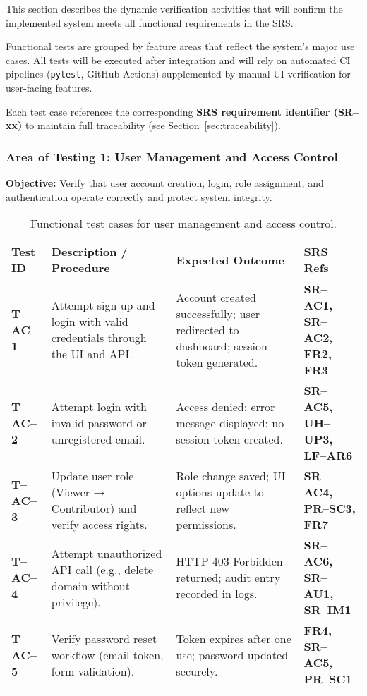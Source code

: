 \documentclass[12pt, titlepage]{article}
\begin{document}
This section describes the dynamic verification activities that will confirm the implemented system meets all functional requirements in the SRS.

Functional tests are grouped by feature areas that reflect the system’s major use cases.
All tests will be executed after integration and will rely on automated CI pipelines
(\texttt{pytest}, GitHub Actions) supplemented by manual UI verification for user-facing features.

Each test case references the corresponding \textbf{SRS requirement identifier (SR--xx)} to maintain full traceability (see Section~\ref{sec:traceability}).

\subsubsection{Area of Testing 1: User Management and Access Control}
\textbf{Objective:} Verify that user account creation, login, role assignment, and authentication operate correctly and protect system integrity.

\begin{table}[H]
\centering
\begin{tabularx}{\textwidth}{|l|X|X|X|}
\hline
\textbf{Test ID} & \textbf{Description / Procedure} & \textbf{Expected Outcome} & \textbf{SRS Refs} \\
\hline
\textbf{T--AC--1} &
Attempt sign-up and login with valid credentials through the UI and API. &
Account created successfully; user redirected to dashboard; session token generated. &
\textbf{SR--AC1, SR--AC2, FR2, FR3} \\
\hline
\textbf{T--AC--2} &
Attempt login with invalid password or unregistered email. &
Access denied; error message displayed; no session token created. &
\textbf{SR--AC5, UH--UP3, LF--AR6} \\
\hline
\textbf{T--AC--3} &
Update user role (Viewer → Contributor) and verify access rights. &
Role change saved; UI options update to reflect new permissions. &
\textbf{SR--AC4, PR--SC3, FR7} \\
\hline
\textbf{T--AC--4} &
Attempt unauthorized API call (e.g., delete domain without privilege). &
HTTP 403 Forbidden returned; audit entry recorded in logs. &
\textbf{SR--AC6, SR--AU1, SR--IM1} \\
\hline
\textbf{T--AC--5} &
Verify password reset workflow (email token, form validation). &
Token expires after one use; password updated securely. &
\textbf{FR4, SR--AC5, PR--SC1} \\
\hline
\end{tabularx}
\caption{Functional test cases for user management and access control.}
\end{table}
\end{document}
